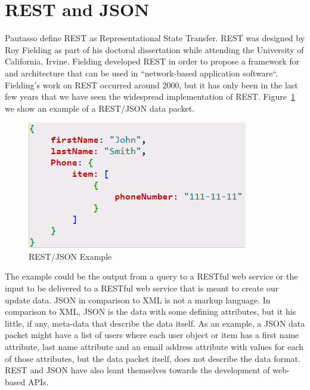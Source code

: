 \section{REST and JSON}
Pautasso\cite{Pautasso2008} define REST as Representational State
Transfer.  REST was designed by Roy Fielding as part of his doctoral
dissertation while attending the University of California, Irvine\cite{Fielding2000}.
Fielding developed REST in order to propose a framework for and architecture
that can be used in ``network-based application software``\cite{Fielding2000}.
Fielding's work on REST occurred around 2000, but it has only been in the last
few years that we have seen the widespread implementation of REST.
Figure~\ref{f:rest-example} we show an example of a REST/JSON data packet.  
\begin{figure}[!ht]
  \centering\includegraphics[width=\columnwidth]{images/json-rest-example.png}
  \caption{REST/JSON Example}\label{f:rest-example}
\end{figure}
The example could be the output from a query to a RESTful web service or the 
input to be delivered to a RESTful web service that is meant to create our update 
data.  JSON in comparison to XML is not a markup language.  In comparison to XML, 
JSON is the data with some defining attributes, but it his little, if any, 
meta-data that describe the data itself.  As an example, a JSON data packet 
might have a list of users where each user object or item has a first name 
attribute, last name attribute and an email address attribute with values for 
each of those attributes, but the data packet itself, does not describe the data 
format.  REST and JSON have also leant themselves towards the development of 
web-based APIs.

